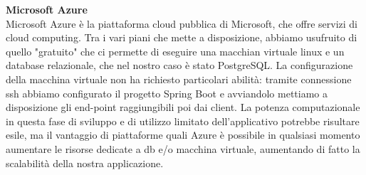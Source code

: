 \begin{flushleft}
    \textbf{Microsoft Azure}\\
    Microsoft Azure è la piattaforma cloud pubblica di Microsoft, che offre servizi di cloud computing. Tra i vari piani che mette a disposizione, abbiamo usufruito
    di quello "gratuito" che ci permette di eseguire una macchian virtuale linux e un database relazionale, che nel nostro caso è stato PostgreSQL.
    La configurazione della macchina virtuale non ha richiesto particolari abilità: tramite connessione ssh abbiamo configurato il progetto Spring Boot e avviandolo 
    mettiamo a disposizione gli end-point raggiungibili poi dai client.
    La potenza computazionale in questa fase di sviluppo e di utilizzo limitato dell'applicativo potrebbe risultare esile, ma il vantaggio di piattaforme quali
    Azure è possibile in qualsiasi momento aumentare le risorse dedicate a db e/o macchina virtuale, aumentando di fatto la scalabilità della nostra applicazione.

\end{flushleft}